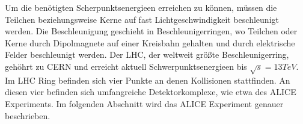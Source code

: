 \newline
Um die ben\"otigten Scherpunktsenergieen erreichen zu k\"onnen, m\"ussen die Teilchen beziehungsweise Kerne auf fast Lichtgeschwindigkeit beschleunigt werden.
Die Beschleunigung geschieht in Beschleunigerringen, wo Teilchen oder Kerne durch Dipolmagnete auf einer Kreisbahn gehalten und durch elektrische Felder beschleunigt werden.
Der LHC, der weltweit gr\"o{\ss}te Beschleunigerring, geh\"ohrt zu CERN und erreicht aktuell Schwerpunktsenergieen bis $\sqrt{s} = 13 TeV$.
Im LHC Ring befinden sich vier Punkte an denen Kollisionen stattfinden.
An diesen vier befinden sich umfangreiche Detektorkomplexe, wie etwa des ALICE Experiments.
Im folgenden Abschnitt wird das ALICE Experiment genauer beschrieben.